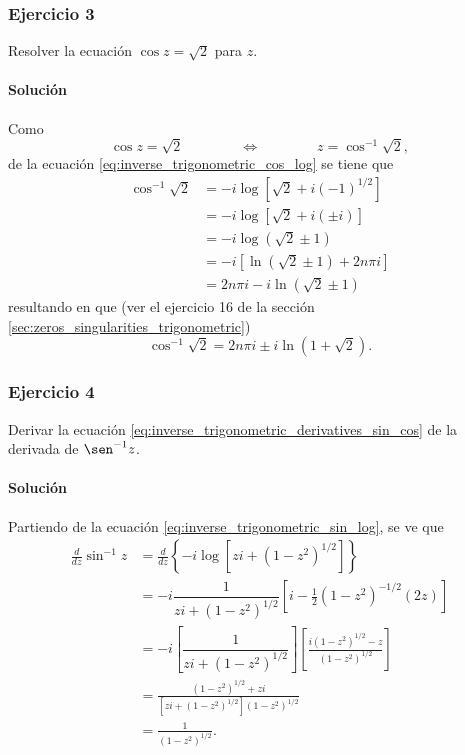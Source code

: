\documentclass[a4paper]{report}
\begin{document}
\subsubsection{Ejercicio 3}

Resolver la ecuación \(\cos z=\sqrt{2}\) para \(z\).

\paragraph{Solución} Como
\[
 \cos z=\sqrt{2}\qquad\qquad\Leftrightarrow\qquad\qquad z=\cos^{-1}\sqrt{2},
\]
de la ecuación \ref{eq:inverse_trigonometric_cos_log} se tiene que
\begin{align*}
 \cos^{-1}\sqrt{2}&=-i\log\left[\sqrt{2}+i(-1)^{1/2}\right]\\
   &=-i\log\left[\sqrt{2}+i(\pm i)\right]\\
   &=-i\log\left(\sqrt{2}\pm 1\right)\\
   &=-i\left[\ln\left(\sqrt{2}\pm 1\right)+2n\pi i\right]\\
   &=2n\pi i-i\ln\left(\sqrt{2}\pm 1\right)
\end{align*}
resultando en que (ver el ejercicio 16 de la sección \ref{sec:zeros_singularities_trigonometric})
\[
 \cos^{-1}\sqrt{2}=2n\pi i\pm i\ln\left(1+\sqrt{2}\right).
\]

\subsubsection{Ejercicio 4}

Derivar la ecuación \ref{eq:inverse_trigonometric_derivatives_sin_cos} de la derivada de \(\sen^{-1}z\).

\paragraph{Solución} Partiendo de la ecuación \ref{eq:inverse_trigonometric_sin_log}, se ve que 
\begin{align*}
 \frac{d}{dz}\sin^{-1}z&=\frac{d}{dz}\left\{-i\log\left[zi+(1-z^2)^{1/2}\right]\right\}\\
  &=-i\dfrac{1}{zi+(1-z^2)^{1/2}}\left[i-\frac{1}{2}(1-z^2)^{-1/2}(2z)\right]\\ 
  &=-i\left[\dfrac{1}{zi+(1-z^2)^{1/2}}\right]\left[\frac{i(1-z^2)^{1/2}-z}{(1-z^2)^{1/2}}\right]\\
  &=\frac{(1-z^2)^{1/2}+zi}{[zi+(1-z^2)^{1/2}](1-z^2)^{1/2}}\\
  &=\frac{1}{(1-z^2)^{1/2}}.
\end{align*}
\end{document}
